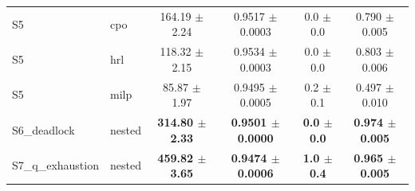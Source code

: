 \begin{tabular}{llcccc}
S5 & cpo & 164.19 $\pm$ 2.24 & 0.9517 $\pm$ 0.0003 & 0.0 $\pm$ 0.0 & 0.790 $\pm$ 0.005 \\
S5 & hrl & 118.32 $\pm$ 2.15 & 0.9534 $\pm$ 0.0003 & 0.0 $\pm$ 0.0 & 0.803 $\pm$ 0.006 \\
S5 & milp & 85.87 $\pm$ 1.97 & 0.9495 $\pm$ 0.0005 & 0.2 $\pm$ 0.1 & 0.497 $\pm$ 0.010 \\
\midrule
S6_deadlock & nested & \textbf{314.80 $\pm$ 2.33} & \textbf{0.9501 $\pm$ 0.0000} & \textbf{0.0 $\pm$ 0.0} & \textbf{0.974 $\pm$ 0.005} \\
\midrule
S7_q_exhaustion & nested & \textbf{459.82 $\pm$ 3.65} & \textbf{0.9474 $\pm$ 0.0006} & \textbf{1.0 $\pm$ 0.4} & \textbf{0.965 $\pm$ 0.005} \\
\bottomrule
\end{tabular}